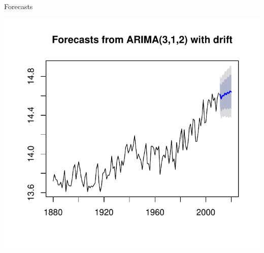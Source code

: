 \begin{frame}[fragile]{Forecasts}
  
\begin{knitrout}
\color{fgcolor}\begin{kframe}
\begin{alltt}
\hlkwb{=}
\end{alltt}
\end{kframe}
\includegraphics[width=\maxwidth]{figure/wakefield-1} 

\end{knitrout}
\end{frame}
